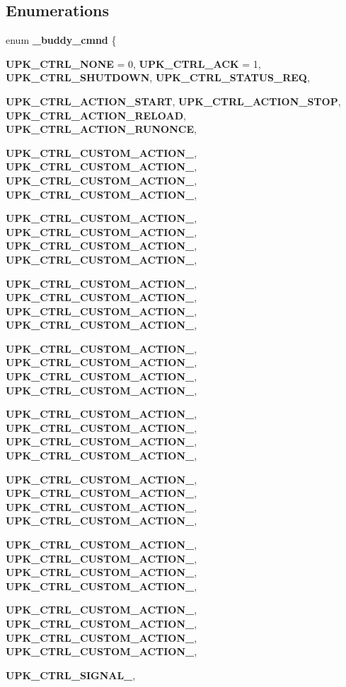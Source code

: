 \subsection*{Enumerations}
\begin{DoxyCompactItemize}
\item 
enum {\bf \_\-buddy\_\-cmnd} \{ \par
{\bf UPK\_\-CTRL\_\-NONE} =  0, 
{\bf UPK\_\-CTRL\_\-ACK} =  1, 
{\bf UPK\_\-CTRL\_\-SHUTDOWN}, 
{\bf UPK\_\-CTRL\_\-STATUS\_\-REQ}, 
\par
{\bf UPK\_\-CTRL\_\-ACTION\_\-START}, 
{\bf UPK\_\-CTRL\_\-ACTION\_\-STOP}, 
{\bf UPK\_\-CTRL\_\-ACTION\_\-RELOAD}, 
{\bf UPK\_\-CTRL\_\-ACTION\_\-RUNONCE}, 
\par
{\bf UPK\_\-CTRL\_\-CUSTOM\_\-ACTION\_}, 
{\bf UPK\_\-CTRL\_\-CUSTOM\_\-ACTION\_}, 
{\bf UPK\_\-CTRL\_\-CUSTOM\_\-ACTION\_}, 
{\bf UPK\_\-CTRL\_\-CUSTOM\_\-ACTION\_}, 
\par
{\bf UPK\_\-CTRL\_\-CUSTOM\_\-ACTION\_}, 
{\bf UPK\_\-CTRL\_\-CUSTOM\_\-ACTION\_}, 
{\bf UPK\_\-CTRL\_\-CUSTOM\_\-ACTION\_}, 
{\bf UPK\_\-CTRL\_\-CUSTOM\_\-ACTION\_}, 
\par
{\bf UPK\_\-CTRL\_\-CUSTOM\_\-ACTION\_}, 
{\bf UPK\_\-CTRL\_\-CUSTOM\_\-ACTION\_}, 
{\bf UPK\_\-CTRL\_\-CUSTOM\_\-ACTION\_}, 
{\bf UPK\_\-CTRL\_\-CUSTOM\_\-ACTION\_}, 
\par
{\bf UPK\_\-CTRL\_\-CUSTOM\_\-ACTION\_}, 
{\bf UPK\_\-CTRL\_\-CUSTOM\_\-ACTION\_}, 
{\bf UPK\_\-CTRL\_\-CUSTOM\_\-ACTION\_}, 
{\bf UPK\_\-CTRL\_\-CUSTOM\_\-ACTION\_}, 
\par
{\bf UPK\_\-CTRL\_\-CUSTOM\_\-ACTION\_}, 
{\bf UPK\_\-CTRL\_\-CUSTOM\_\-ACTION\_}, 
{\bf UPK\_\-CTRL\_\-CUSTOM\_\-ACTION\_}, 
{\bf UPK\_\-CTRL\_\-CUSTOM\_\-ACTION\_}, 
\par
{\bf UPK\_\-CTRL\_\-CUSTOM\_\-ACTION\_}, 
{\bf UPK\_\-CTRL\_\-CUSTOM\_\-ACTION\_}, 
{\bf UPK\_\-CTRL\_\-CUSTOM\_\-ACTION\_}, 
{\bf UPK\_\-CTRL\_\-CUSTOM\_\-ACTION\_}, 
\par
{\bf UPK\_\-CTRL\_\-CUSTOM\_\-ACTION\_}, 
{\bf UPK\_\-CTRL\_\-CUSTOM\_\-ACTION\_}, 
{\bf UPK\_\-CTRL\_\-CUSTOM\_\-ACTION\_}, 
{\bf UPK\_\-CTRL\_\-CUSTOM\_\-ACTION\_}, 
\par
{\bf UPK\_\-CTRL\_\-CUSTOM\_\-ACTION\_}, 
{\bf UPK\_\-CTRL\_\-CUSTOM\_\-ACTION\_}, 
{\bf UPK\_\-CTRL\_\-CUSTOM\_\-ACTION\_}, 
{\bf UPK\_\-CTRL\_\-CUSTOM\_\-ACTION\_}, 
\par
{\bf UPK\_\-CTRL\_\-SIGNAL\_}, 

\end{DoxyCompactItemize}
